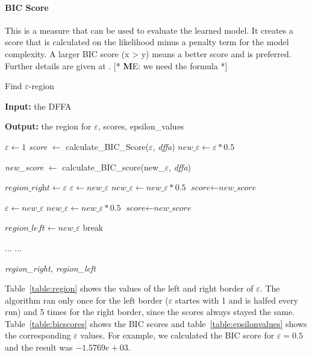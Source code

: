 \documentclass[
a4paper,
12pt
]{scrartcl}
\newcommand\me[1]{ [* {\textbf ME:} #1 *]}
\begin{document}
\paragraph{BIC Score} This is a measure that can be used to evaluate the learned model. It creates a score that is calculated on the likelihood minus a penalty term for the model complexity. A larger BIC score (x > y) means a better score and is preferred. Further details are given at \cite{Mao.}.
\me{we need the formula}

\begin{algorithm}[H]
\caption{Find $\varepsilon$-region}\label{alg:findregion}
\begin{algorithmic}[1]
\item \textbf{Input:} the DFFA
\item \textbf{Output:} the region for $\varepsilon$, scores, epsilon\_values

\State $\varepsilon \gets \textit{1}$
\State \textit{score} $\gets$ calculate\_BIC\_Score($\varepsilon$, \textit{dffa})
\State $new\_\varepsilon \gets \varepsilon * 0.5$


       \State \textit{new\_score} $\gets$ calculate\_BIC\_score(new\_$\varepsilon$, \textit{dffa})

           \label{findregion:scorelarger}
         \State $\textit{region\_right} \gets \varepsilon$
         \State $\varepsilon \gets new\_\varepsilon$
         \State $ new\_\varepsilon \gets new\_\varepsilon * 0.5$
         \State $\textit{score} \gets \textit{new\_score} $

           \label{findregion:scorethesame}
   	 \State $\varepsilon \gets new\_\varepsilon$
         \State $ new\_\varepsilon \gets new\_\varepsilon * 0.5$
         \State $\textit{score} \gets \textit{new\_score} $

      \Else \label{findregion:scoresmaller}
      \State $\textit{region\_left} \gets new\_\varepsilon$
        \State break
       \EndIf

  \EndWhile

  \State ...
  \State ...

\State \Return \textit{region\_right, region\_left}
\end{algorithmic}
\end{algorithm}

Table~\ref{table:region} shows the values of the left and right border of $\varepsilon$. The algorithm ran only once for the left border ($\varepsilon$ startes with 1 and is halfed every run) and 5 times for the right border, since the scores always stayed the same. Table~\ref{table:bicscores} shows the BIC scores and table~\ref{table:epsilonvalues} shows the corresponding $\varepsilon$ values. For example, we calculated the BIC score for $\varepsilon = 0.5$ and the result was $-1.5769e+03$.
\end{document}
